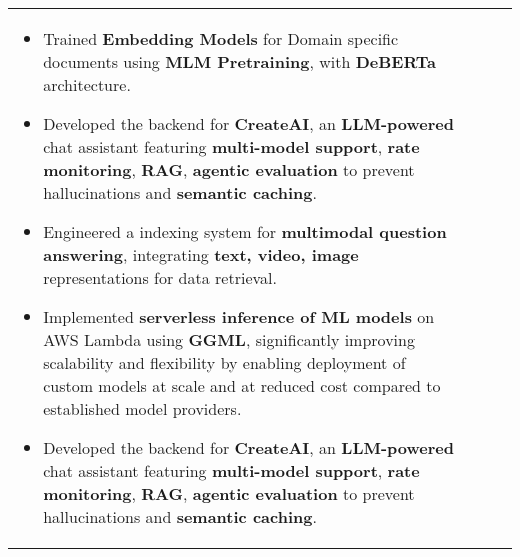 \documentclass[10pt,a4]{article}
\begin{document}
{\begin{tabu}
\begin{center}
\begin{tabular} {p{} p{} p{} p{}}
\begin{flushleft}
\begin{itemize}
        \item Trained \textbf{Embedding Models} for Domain specific documents using \textbf{MLM Pretraining}, with  \textbf{DeBERTa} architecture.
        \item Developed the backend for \textbf{CreateAI}, an \textbf{LLM-powered} chat assistant featuring \textbf{multi-model support}, \textbf{rate monitoring}, \textbf{RAG}, \textbf{agentic evaluation} to prevent hallucinations and \textbf{semantic caching}.

        \item Engineered a indexing system for \textbf{multimodal question answering}, integrating \textbf{text, video, image} representations for data retrieval.
        \item Implemented \textbf{serverless inference of ML models} on AWS Lambda using \textbf{GGML}, significantly improving scalability and flexibility by enabling deployment of custom models at scale and at reduced cost compared to established model providers.

        \item Developed the backend for \textbf{CreateAI}, an \textbf{LLM-powered} chat assistant featuring \textbf{multi-model support}, \textbf{rate monitoring}, \textbf{RAG}, \textbf{agentic evaluation} to prevent hallucinations and \textbf{semantic caching}.


\end{itemize}
\end{flushleft}
\end{tabular}
\end{center}
\end{tabu}}
\end{document}
